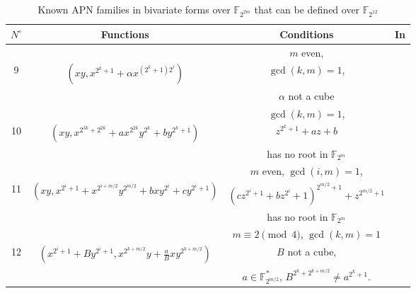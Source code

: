 \documentclass{article}
\begin{document}
\begin{table}[h!]
    \centering
    \scriptsize{
    \begin{tabular}{|c|c|c|c|}
    \hline
      $N^\circ$&Functions &  Conditions &  In\\
      \hline
      \hline
      &&$m$ even,&\\
      9	& $(xy,x^{2^k+1} +\alpha x^{(2^k+1)2^i})$ &  $\gcd(k,m)=1$,   & \cite{pott}\\
      &&$\alpha$ not a cube&\\
        \hline
        &&$\gcd(k,m)=1$,&\\
	10 & $(xy, x^{2^{3k}+2^{2k}}+ax^{2^{2k}}y^{2^k}+by^{2^k+1})$ & $z^{2^k+1}+az+b$  &   \cite{tan19}\\
		&&has no root in $\mathbb{F}_{2^{m}}$ &\\
	  \hline
		 &  & $m$ even, $\gcd(i,m)=1$,& \\
		11&$(xy, x^{2^i+1}+x^{2^{i+m/2}}y^{2^{m/2}}+bxy^{2^i}+cy^{2^i+1})$& $(cz^{2^i+1}+bz^{2^i}+1)^{2^{m/2}+1}+z^{2^{m/2}+1}$&\cite{CBC21}\\
		&& has no root in $\mathbb{F}_{2^{m}}$ &   \\
		  \hline
		 &  &$m\equiv 2 \pmod 4$, $\gcd(k,m)=1$ &\\
	12	&$(x^{2^i+1}+By^{2^i+1}, x^{2^{k+m/2}}y+\frac{a}{B}xy^{2^{k+m/2}})$&$B$ not a cube,&
		\cite{golkol}\\
		&& $a \in \mathbb{F}_{2^{m/2}}^*$, $B^{2^{k}+2^{k+m/2}} \ne a^{2^{k}+1}.$&\\
		\hline
	
    \end{tabular}
    \caption{Known APN families in bivariate forms over $\mathbb{F}_{2^{2m}}$ that can be defined over $\mathbb{F}_{2^{12}}$}
    \label{tab:APNfambiv}}
\end{table}
\end{document}
